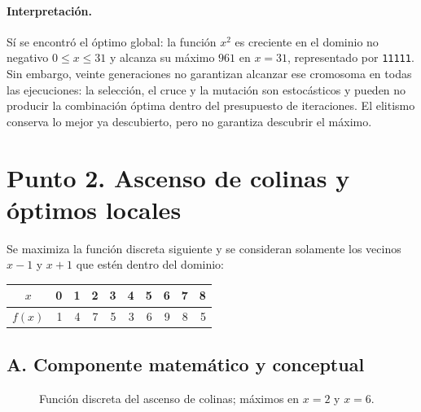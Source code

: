 \documentclass[11pt,a4paper]{article}
\begin{document}
\paragraph{Interpretación.} Sí se encontró el óptimo global: la función $x^2$ es creciente en el dominio no negativo $0\le x\le31$ y alcanza su máximo $961$ en $x=31$, representado por \texttt{11111}. Sin embargo, veinte generaciones no garantizan alcanzar ese cromosoma en todas las ejecuciones: la selección, el cruce y la mutación son estocásticos y pueden no producir la combinación óptima dentro del presupuesto de iteraciones. El elitismo conserva lo mejor ya descubierto, pero no garantiza descubrir el máximo.

\section{Punto 2. Ascenso de colinas y óptimos locales}
Se maximiza la función discreta siguiente y se consideran solamente los vecinos $x-1$ y $x+1$ que estén dentro del dominio:
\begin{table}[H]\centering\begin{tabular}{c|rrrrrrrrr}\toprule$x$&0&1&2&3&4&5&6&7&8\\\midrule$f(x)$&1&4&7&5&3&6&9&8&5\\\bottomrule\end{tabular}\end{table}
\subsection{A. Componente matemático y conceptual}
\begin{figure}[H]
\centering
{}
\caption{Función discreta del ascenso de colinas; máximos en $x=2$ y $x=6$.}
\end{figure}
\end{document}
